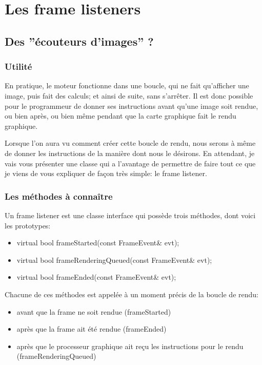 \documentclass[10pt,a4paper]{report}
\begin{document}
\section{Les frame listeners}





\subsection{Des ''\'ecouteurs d'images'' ?}
\subsubsection{Utilit\'e}


En pratique, le moteur fonctionne dans une boucle, qui ne fait qu'afficher une image, puis fait des calculs; et ainsi de suite, sans s'arr\^eter. Il est donc possible pour le programmeur de donner ses instructions avant qu'une image soit rendue, ou bien apr\`es, ou bien m\^eme pendant que la carte graphique fait le rendu graphique.

Lorsque l'on aura vu comment cr\'eer cette boucle de rendu, nous serons \`{a} m\^eme de donner les instructions de la mani\`ere dont nous le d\'esirons. En attendant, je vais vous pr\'esenter une classe qui a l'avantage de permettre de faire tout ce que je viens de vous expliquer de fa\c{c}on tr\`es simple: le frame listener.



\subsubsection{Les m\'ethodes \`{a} conna\^itre}
Un frame listener est une classe interface qui poss\`ede trois m\'ethodes, dont voici les prototypes:

\begin{itemize}
\item virtual bool frameStarted(const FrameEvent\& evt);
\item virtual bool frameRenderingQueued(const FrameEvent\& evt);
\item virtual bool frameEnded(const FrameEvent\& evt);
\end{itemize}
    

Chacune de ces m\'ethodes est appel\'ee \`{a} un moment pr\'ecis de la boucle de rendu:
\begin{itemize}
\item avant que la frame ne soit rendue (frameStarted)
\item apr\`es que la frame ait \'et\'e rendue (frameEnded)
\item apr\`es que le processeur graphique ait re\c{c}u les instructions pour le rendu (frameRenderingQueued)
\end{itemize}
\end{document}
